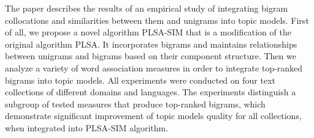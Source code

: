 The paper describes the results of an empirical study of integrating bigram collocations and similarities between them and unigrams into topic models. First of all, we propose a novel algorithm PLSA-SIM that is a modification of the original algorithm PLSA. It incorporates bigrams and maintains relationships between unigrams and bigrams based on their component structure. Then we analyze a variety of word association measures in order to integrate top-ranked bigrams into topic models. All experiments were conducted on four text collections of different domains and languages. The experiments distinguish a subgroup of tested measures that produce top-ranked bigrams, which demonstrate significant improvement of topic models quality for all collections, when integrated into PLSA-SIM algorithm.
